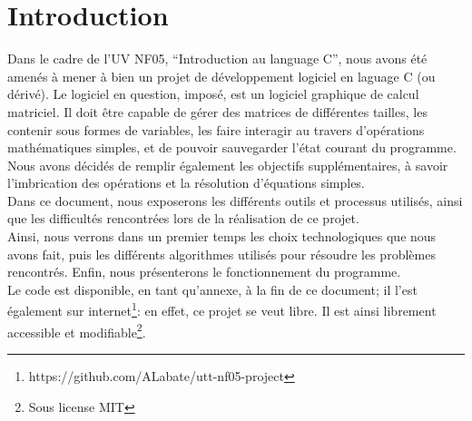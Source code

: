 \chapter{Introduction}
        Dans le cadre de l'UV NF05, ``Introduction au language C'', nous avons été amenés à mener à bien un projet de développement logiciel en laguage C (ou dérivé).
    Le logiciel en question, imposé, est un logiciel graphique de calcul matriciel. Il doit être capable de gérer des matrices de différentes tailles,
    les contenir sous formes de variables, les faire interagir au travers d'opérations mathématiques simples, et de pouvoir sauvegarder l'état courant du programme.
    Nous avons décidés de remplir également les objectifs supplémentaires, à savoir l'imbrication des opérations et la résolution d'équations simples.
    \\
    Dans ce document, nous exposerons les différents outils et processus utilisés, ainsi que les difficultés rencontrées lors de la réalisation de ce
    projet.\\ 
    Ainsi, nous verrons dans un premier temps les choix technologiques que nous avons fait, puis les différents algorithmes utilisés pour résoudre
    les problèmes rencontrés. Enfin, nous présenterons le fonctionnement du programme.\\
    Le code est disponible, en tant qu'annexe, à la fin de ce document; il l'est également sur internet\footnote{https://github.com/ALabate/utt-nf05-project}: en effet, ce projet se veut libre. Il est ainsi librement accessible et modifiable\footnote{Sous license MIT}.